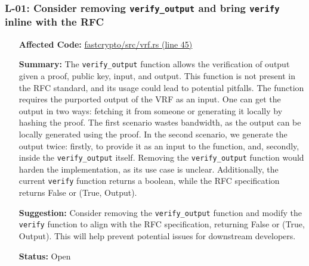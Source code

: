 \subsubsection*{L-01: Consider removing \lstinline{verify_output} and bring \lstinline{verify} inline with the RFC}
\begin{itemize}[align=left]
    \item[\textbf{Affected Code:}] \href{https://github.com/MystenLabs/fastcrypto/blob/963205c6d0538fe548b8b10037cf87a53af6f424/fastcrypto/src/vrf.rs#L45}{fastcrypto/src/vrf.rs (line 45)}
    \item[\textbf{Summary:}] The \lstinline{verify_output} function allows the verification of output given a proof, public key, input, and output. This function is not present in the RFC standard, and its usage could lead to potential pitfalls. The function requires the purported output of the VRF as an input. One can get the output in two ways: fetching it from someone or generating it locally by hashing the proof. The first scenario wastes bandwidth, as the output
    can be locally generated using the proof. In the second scenario, we generate the output twice: firstly, to provide it as an input to the function, and, secondly, inside the \lstinline{verify_output} itself. Removing the \lstinline{verify_output} function would harden the implementation, as its use case is unclear. Additionally, the current \lstinline{verify} function returns a boolean, while the RFC specification returns False or (True, Output).
    \item[\textbf{Suggestion:}] Consider removing the \lstinline{verify_output} function and modify the \lstinline{verify} function to align with the RFC specification, returning False or (True, Output). This will help prevent potential issues for downstream developers.
    \item[\textbf{Status:}] Open
\end{itemize}


